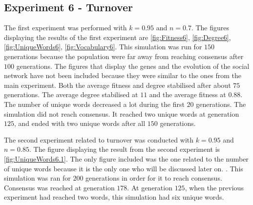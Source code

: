\subsection{Experiment 6 - Turnover}
The first experiment was performed with $k = 0.95$ and $n = 0.7$. The figures displaying the results of the first experiment are \ref{fig:Fitness6}, \ref{fig:Degree6}, \ref{fig:UniqueWords6}, \ref{fig:Vocabulary6}. This simulation was run for $150$ generations because the population were far away from reaching consensus after $100$ generations. The figures that display the genes and the evolution of the social network have not been included because they were similar to the ones from the main experiment. Both the average fitness and degree stabilised after about $75$ generations. The average degree stabilised at $11$ and the average fitness at $0.88$. The number of unique words decreased a lot during the first $20$ generations. The simulation did not reach consensus. It reached two unique words at generation $125$, and ended with two unique words after all $150$ generations.   

The second experiment related to turnover was conducted with $k = 0.95$ and $n = 0.85$. The figure displaying the result from the second experiment is \ref{fig:UniqueWords6.1}. The only figure included was the one related to the number of unique words because it is the only one who will be discussed later on. . This simulation was ran for $200$ generations in order for it to reach consensus. Consensus was reached at generation $178$. At generation $125$, when the previous experiment had reached two words, this simulation had six unique words. 


